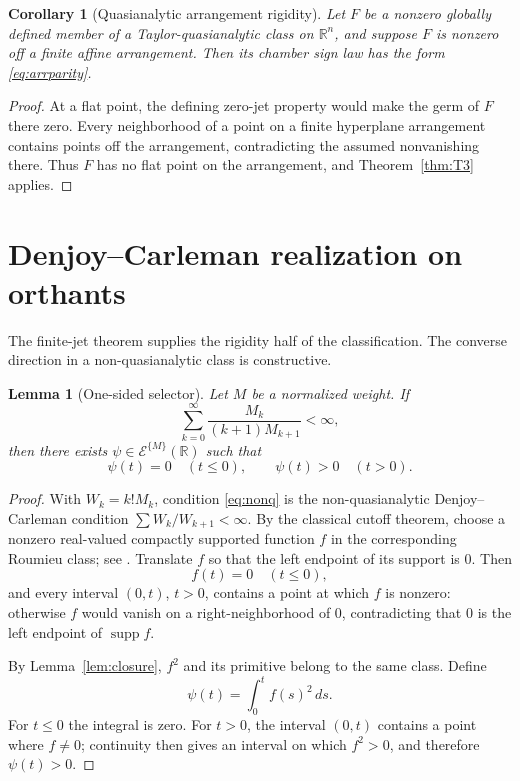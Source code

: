 \documentclass[11pt]{article}
\newtheorem{lemma}[theorem]{Lemma}
\newtheorem{corollary}[theorem]{Corollary}
\theoremstyle{definition}
\theoremstyle{remark}
\newcommand{\R}{\mathbb{R}}
\begin{document}
\begin{corollary}[Quasianalytic arrangement rigidity]\label{cor:quasiarr}
Let $F$ be a nonzero globally defined member of a Taylor-quasianalytic class on $\R^n$, and suppose $F$ is nonzero off a finite affine arrangement. Then its chamber sign law has the form \eqref{eq:arrparity}.
\end{corollary}

\begin{proof}
At a flat point, the defining zero-jet property would make the germ of $F$ there zero. Every neighborhood of a point on a finite hyperplane arrangement contains points off the arrangement, contradicting the assumed nonvanishing there. Thus $F$ has no flat point on the arrangement, and Theorem~\ref{thm:T3} applies.
\end{proof}

\section{Denjoy--Carleman realization on orthants}\label{sec:dc}

The finite-jet theorem supplies the rigidity half of the classification. The converse direction in a non-quasianalytic class is constructive.

\begin{lemma}[One-sided selector]\label{thm:T4}
Let $M$ be a normalized weight. If
\begin{equation}\label{eq:nonq}
 \sum_{k=0}^{\infty}\frac{M_k}{(k+1)M_{k+1}}<\infty,
\end{equation}
then there exists $\psi\in\mathcal{E}^{\{M\}}(\R)$ such that
\[
 \psi(t)=0\quad(t\le0),
 \qquad
 \psi(t)>0\quad(t>0).
\]
\end{lemma}

\begin{proof}
With $W_k=k!M_k$, condition \eqref{eq:nonq} is the non-quasianalytic Denjoy--Carleman condition $\sum W_k/W_{k+1}<\infty$. By the classical cutoff theorem, choose a nonzero real-valued compactly supported function $f$ in the corresponding Roumieu class; see \cite[Theorem~3.6 and Corollary~3.12]{Rainer2022}. Translate $f$ so that the left endpoint of its support is $0$. Then
\[
 f(t)=0\quad(t\le0),
\]
and every interval $(0,t)$, $t>0$, contains a point at which $f$ is nonzero: otherwise $f$ would vanish on a right-neighborhood of $0$, contradicting that $0$ is the left endpoint of $\operatorname{supp}f$.

By Lemma~\ref{lem:closure}, $f^2$ and its primitive belong to the same class. Define
\[
 \psi(t)=\int_0^t f(s)^2\,ds.
\]
For $t\le0$ the integral is zero. For $t>0$, the interval $(0,t)$ contains a point where $f\ne0$; continuity then gives an interval on which $f^2>0$, and therefore $\psi(t)>0$.
\end{proof}
\end{document}
